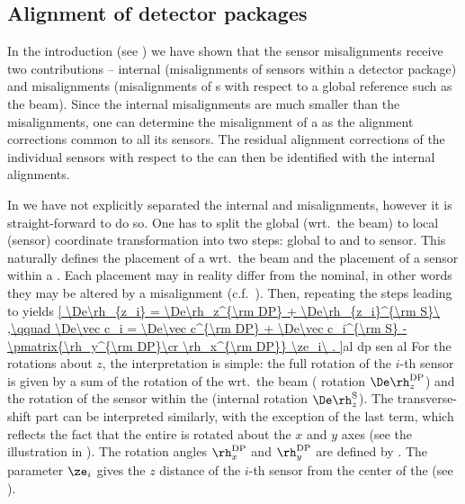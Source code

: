 \subsection[al dp fac]{Alignment of detector packages}

In the introduction (see ) we have shown that the sensor misalignments receive two contributions -- internal (misalignments of sensors within a detector package) and  misalignments (misalignments of s with respect to a global reference such as the beam). Since the internal misalignments are much smaller than the  misalignments, one can determine the misalignment of a  as the alignment corrections common to all its sensors. The residual alignment corrections of the individual sensors with respect to the  can then be identified with the internal alignments.

In  we have not explicitly separated the internal and  misalignments, however it is straight-forward to do so. One has to split the global (wrt.~the beam) to local (sensor) coordinate transformation  into two steps: global to  and  to sensor. This naturally defines the placement of a  wrt.~the beam and the placement of a sensor within a . Each placement may in reality differ from the nominal, in other words they may be altered by a misalignment (c.f.~). Then, repeating the steps leading to  yields
\eqref{
	\De\rh_{z_i} = \De\rh_z^{\rm DP} + \De\rh_{z_i}^{\rm S}\ ,\qquad
	\De\vec c_i = \De\vec c^{\rm DP} + \De\vec c_i^{\rm S} - \pmatrix{\rh_y^{\rm DP}\cr \rh_x^{\rm DP}} \ze_i\ .
}{al dp sen al}
For the rotations about $z$, the interpretation is simple: the full rotation of the $i$-th sensor is given by a sum of the rotation of the  wrt.~the beam ( rotation $\De\rh_z^{\rm DP}$) and the rotation of the sensor within the  (internal rotation $\De\rh_z^{\rm S}$). The transverse-shift part can be interpreted similarly, with the exception of the last term, which reflects the fact that the entire  is rotated about the $x$ and $y$ axes (see the illustration in ). The rotation angles $\rh_x^{\rm DP}$ and $\rh_y^{\rm DP}$ are defined by . The parameter $\ze_i$ gives the $z$ distance of the $i$-th sensor from the center of the  (see ).


